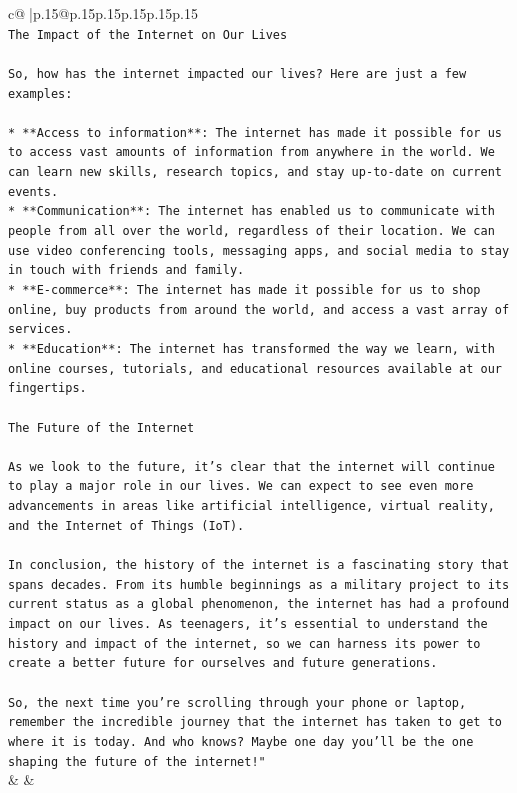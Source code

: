 \documentclass{article}
\begin{document}
{\begin{supertabular}{c@{$\;$}|p{.15\linewidth}@{}p{.15\linewidth}p{.15\linewidth}p{.15\linewidth}p{.15\linewidth}p{.15\linewidth}}
{{{\\ 
\texttt{The Impact of the Internet on Our Lives} \\
\\ 
\texttt{So, how has the internet impacted our lives? Here are just a few examples:} \\
\\ 
\texttt{* **Access to information**: The internet has made it possible for us to access vast amounts of information from anywhere in the world. We can learn new skills, research topics, and stay up{-}to{-}date on current events.} \\
\texttt{* **Communication**: The internet has enabled us to communicate with people from all over the world, regardless of their location. We can use video conferencing tools, messaging apps, and social media to stay in touch with friends and family.} \\
\texttt{* **E{-}commerce**: The internet has made it possible for us to shop online, buy products from around the world, and access a vast array of services.} \\
\texttt{* **Education**: The internet has transformed the way we learn, with online courses, tutorials, and educational resources available at our fingertips.} \\
\\ 
\texttt{The Future of the Internet} \\
\\ 
\texttt{As we look to the future, it's clear that the internet will continue to play a major role in our lives. We can expect to see even more advancements in areas like artificial intelligence, virtual reality, and the Internet of Things (IoT).} \\
\\ 
\texttt{In conclusion, the history of the internet is a fascinating story that spans decades. From its humble beginnings as a military project to its current status as a global phenomenon, the internet has had a profound impact on our lives. As teenagers, it's essential to understand the history and impact of the internet, so we can harness its power to create a better future for ourselves and future generations.} \\
\\ 
\texttt{So, the next time you're scrolling through your phone or laptop, remember the incredible journey that the internet has taken to get to where it is today. And who knows? Maybe one day you'll be the one shaping the future of the internet!"} \\
            }
        }
    }
    & & \\ \\


\end{supertabular}}
\end{document}
